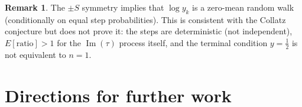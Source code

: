 \documentclass[12pt, a4paper]{amsart}
\theoremstyle{plain}
\theoremstyle{definition}
\newtheorem{remark}[theorem]{Remark}
\theoremstyle{remark}
\begin{document}
\begin{remark}
  The $\pm S$ symmetry implies that $\log y_k$ is a zero-mean random
  walk (conditionally on equal step probabilities).  This is consistent
  with the Collatz conjecture but does not prove it: the steps are
  deterministic (not independent), $E[\text{ratio}]>1$ for the
  $\operatorname{Im}(\tau)$ process itself, and the terminal condition
  $y=\frac{1}{2}$ is not equivalent to $n=1$.
\end{remark}

\section{Directions for further work}
\label{sec:further}
\end{document}
